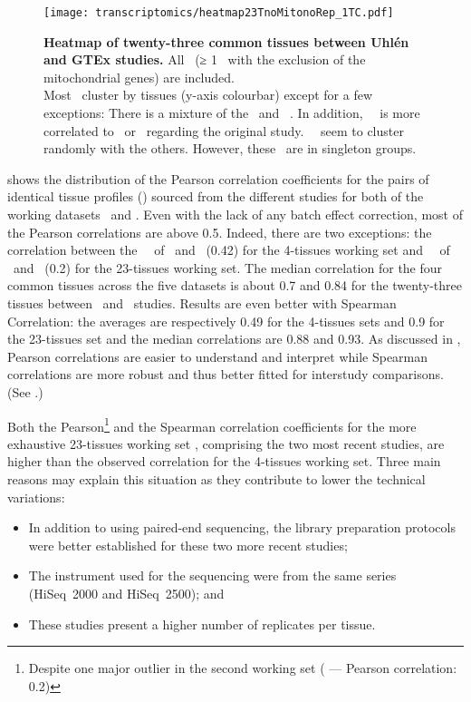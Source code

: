 \begin{figure}[!htpb]
    \texttt{[image: transcriptomics/heatmap23TnoMitonoRep\_1TC.pdf]}\centering
    \caption[Heatmap of 23 common tissues between Uhlén and GTEx studies]%
    {\label{fig:noMitoNoRep23T}%
    \textbf{Heatmap of twenty-three common tissues between Uhlén and GTEx studies.}
    All \pcgs\ (≥ 1 \FPKM\ with the exclusion of the mitochondrial
    genes) are included.\\Most \treps\ cluster by tissues (y-axis colourbar)
    except for a few exceptions:
    There is a mixture of the \fallopian\
    and \Ovary\ \treps.
    In addition, \Salivary\ \treps\ is more correlated to
    \Esophagus\ or \Stomach\ regarding the original study.
    \Bladder\ \treps\ seem to cluster randomly with the others.
    However, these \treps\ are in singleton groups.}
\end{figure}

 shows the distribution of the Pearson correlation
coefficients for the pairs of identical tissue profiles (\treps)
sourced from the different studies
for both of the working datasets \setOne\ and \setTwo.
Even with the lack of any batch effect correction,
most of the Pearson correlations are above 0.5.
Indeed,
there are two exceptions: the
correlation between the \Testis\ \treps\ of \castle\ and \vt\ (0.42)
for the 4-tissues working set and
\Salivary\ \treps\ of \uhlen\ and \gtex\ (0.2)
for the 23-tissues working set.
The median correlation for the four common tissues across the five datasets is
about 0.7 and 0.84 for the twenty-three tissues between \uhlen\ and \gtex\ studies.
Results are even better with Spearman Correlation:
the averages are respectively 0.49 for the 4-tissues sets
and 0.9 for the 23-tissues set and
the median correlations are 0.88 and 0.93.
As discussed in ,
Pearson correlations are easier to understand and interpret
while Spearman correlations are more robust and thus better fitted for interstudy
comparisons.
(See .)

\label{seg:betterTreps}
Both the Pearson\footnote{Despite one major outlier in the second
working set (\tissue{Salivary gland} --- Pearson correlation: 0.2)} and the
Spearman correlation coefficients for the more exhaustive 23-tissues working set
\setTwo,
comprising the two most recent studies,
are higher than the observed correlation for the 4-tissues working set.
Three main reasons may explain this situation as they contribute to lower
the technical variations:
\vspace{-3mm}
\begin{itemize}[topsep=0pt,nosep]
    \item In addition to using paired-end sequencing,
        the library preparation protocols were better established
        for these two more recent studies;
    \item The instrument used for the sequencing were
        from the same series (HiSeq~2000 and HiSeq~2500); and
    \item These studies present a higher number of replicates per tissue.
\end{itemize}

